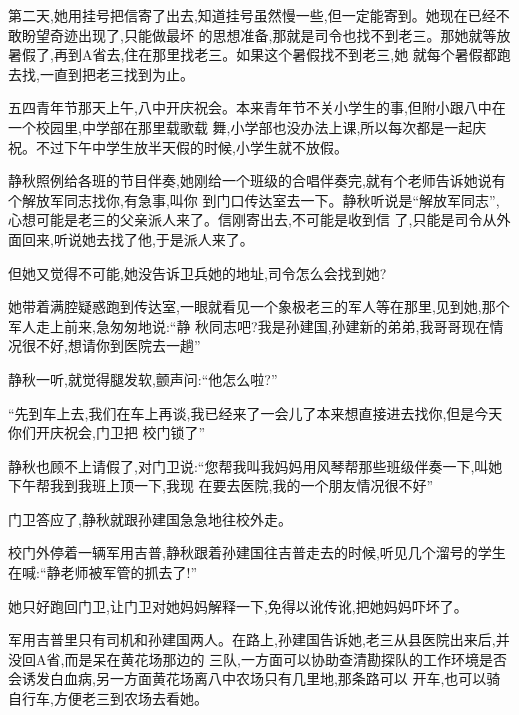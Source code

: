 ﻿\documentclass[12pt]{article}
\begin{document}
第二天,她用挂号把信寄了出去,知道挂号虽然慢一些,但一定能寄到。她现在已经不敢盼望奇迹出现了,只能做最坏
的思想准备,那就是司令也找不到老三。那她就等放暑假了,再到A省去,住在那里找老三。如果这个暑假找不到老三,她
就每个暑假都跑去找,一直到把老三找到为止。



五四青年节那天上午,八中开庆祝会。本来青年节不关小学生的事,但附小跟八中在一个校园里,中学部在那里载歌载
舞,小学部也没办法上课,所以每次都是一起庆祝。不过下午中学生放半天假的时候,小学生就不放假。



静秋照例给各班的节目伴奏,她刚给一个班级的合唱伴奏完,就有个老师告诉她说有个解放军同志找你,有急事,叫你
到门口传达室去一下。静秋听说是``解放军同志'',心想可能是老三的父亲派人来了。信刚寄出去,不可能是收到信
了,只能是司令从外面回来,听说她去找了他,于是派人来了。



但她又觉得不可能,她没告诉卫兵她的地址,司令怎么会找到她?



她带着满腔疑惑跑到传达室,一眼就看见一个象极老三的军人等在那里,见到她,那个军人走上前来,急匆匆地说:``静
秋同志吧?我是孙建国,孙建新的弟弟,我哥哥现在情况很不好,想请你到医院去一趟\myrule ''



静秋一听,就觉得腿发软,颤声问:``他\myrule 怎么啦?''



``先到车上去,我们在车上再谈,我已经来了一会儿了\myrule 本来想直接进去找你,但是今天你们开庆祝会,门卫把
校门锁了\myrule ''



静秋也顾不上请假了,对门卫说:``您帮我叫我妈妈用风琴帮那些班级伴奏一下,叫她下午帮我到我班上顶一下,我现
在要去医院,我的一个朋友\myrule 情况很不好\myrule ''



门卫答应了,静秋就跟孙建国急急地往校外走。



校门外停着一辆军用吉普,静秋跟着孙建国往吉普走去的时候,听见几个溜号的学生在喊:``静老师被军管的抓去了!''



她只好跑回门卫,让门卫对她妈妈解释一下,免得以讹传讹,把她妈妈吓坏了。



军用吉普里只有司机和孙建国两人。在路上,孙建国告诉她,老三从县医院出来后,并没回A省,而是呆在黄花场那边的
三队,一方面可以协助查清勘探队的工作环境是否会诱发白血病,另一方面黄花场离八中农场只有几里地,那条路可以
开车,也可以骑自行车,方便老三到农场去看她。
\end{document}

